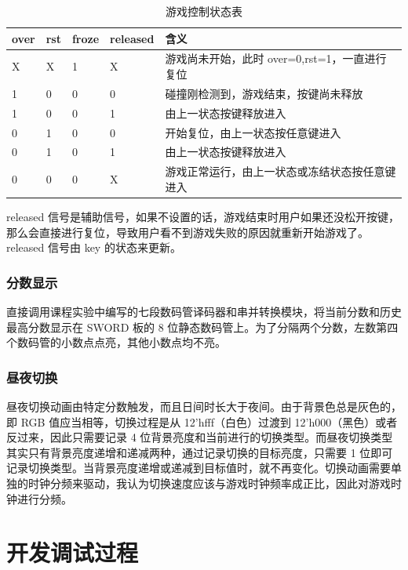 \documentclass[hyperref,UTF8,12pt,a4paper]{ctexart}
\begin{document}
\begin{longtable}[]{@{}lllll@{}}
\caption{游戏控制状态表}\tabularnewline
\toprule
over & rst & froze & released & 含义 \\
\midrule
\endhead
X & X & 1 & X & 游戏尚未开始，此时 over=0,rst=1，一直进行复位 \\
1 & 0 & 0 & 0 & 碰撞刚检测到，游戏结束，按键尚未释放 \\
1 & 0 & 0 & 1 & 由上一状态按键释放进入 \\
0 & 1 & 0 & 0 & 开始复位，由上一状态按任意键进入 \\
0 & 1 & 0 & 1 & 由上一状态按键释放进入 \\
0 & 0 & 0 & X & 游戏正常运行，由上一状态或冻结状态按任意键进入 \\
\bottomrule
\end{longtable}

released
信号是辅助信号，如果不设置的话，游戏结束时用户如果还没松开按键，那么会直接进行复位，导致用户看不到游戏失败的原因就重新开始游戏了。released
信号由 key 的状态来更新。

\hypertarget{ux5206ux6570ux663eux793a}{%
\subsubsection{分数显示}\label{ux5206ux6570ux663eux793a}}

直接调用课程实验中编写的七段数码管译码器和串并转换模块，将当前分数和历史最高分数显示在
SWORD 板的 8
位静态数码管上。为了分隔两个分数，左数第四个数码管的小数点点亮，其他小数点均不亮。

\hypertarget{ux663cux591cux5207ux6362}{%
\subsubsection{昼夜切换}\label{ux663cux591cux5207ux6362}}

昼夜切换动画由特定分数触发，而且日间时长大于夜间。由于背景色总是灰色的，即
RGB 值应当相等，切换过程是从 12'hfff（白色）过渡到
12'h000（黑色）或者反过来，因此只需要记录 4
位背景亮度和当前进行的切换类型。而昼夜切换类型其实只有背景亮度递增和递减两种，通过记录切换的目标亮度，只需要
1
位即可记录切换类型。当背景亮度递增或递减到目标值时，就不再变化。切换动画需要单独的时钟分频来驱动，我认为切换速度应该与游戏时钟频率成正比，因此对游戏时钟进行分频。

\hypertarget{debug}{%
\section{开发调试过程}\label{debug}}
\end{document}
